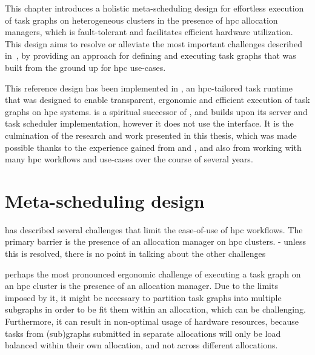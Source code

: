 

This chapter introduces a holistic meta-scheduling design for effortless execution of task graphs
on heterogeneous clusters in the presence of \gls{hpc} allocation managers, which is fault-tolerant
and facilitates efficient hardware utilization. This design aims to resolve or alleviate
the most important challenges described in~, by providing an approach for defining and
executing task graphs that was built from the ground up for \gls{hpc} use-cases.

This reference design has been implemented in \hyperqueue{}, an \gls{hpc}-tailored task runtime that
was designed to enable transparent, ergonomic and efficient execution of task graphs on
\gls{hpc} systems. \hyperqueue{} is a spiritual successor of
\rsds{}, and builds upon its server and task scheduler implementation, however it
does not use the \dask{} interface. It is the culmination of the research and
work presented in this thesis, which was made possible thanks to the experience gained from
\estee{} and \rsds{}, and also from working with many \gls{hpc} workflows and use-cases
over the course of several years.

\section{Meta-scheduling design}
 has described several challenges that limit the ease-of-use of \gls{hpc}
workflows. The primary barrier is the presence of an allocation manager on \gls{hpc} clusters.
- unless this is resolved, there is no point in talking about the other challenges

perhaps the most pronounced ergonomic challenge of
executing a task graph on an \gls{hpc} cluster is the presence of an allocation
manager. Due to the limits imposed by it, it might be necessary to partition task graphs into
multiple subgraphs in order to be fit them within an allocation, which can be challenging.
Furthermore, it can result in non-optimal usage of hardware resources, because tasks from
(sub)graphs submitted in separate allocations will only be load balanced within their own
allocation, and not across different allocations.

